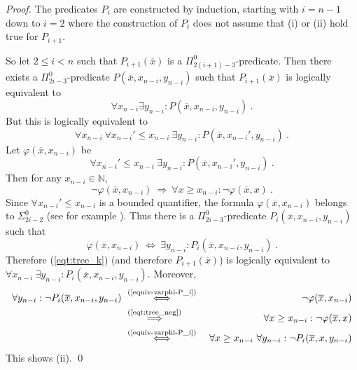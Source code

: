 \documentclass[envcountsame]{llncs}
\newcommand{\N}{\mathbb N}
\begin{document}
\begin{proof}
  The predicates $P_i$ are constructed by induction, starting with
  $i=n-1$ down to $i=2$ where the construction of $P_i$ does not
  assume that (i) or (ii) hold true for $P_{i+1}$.

  So let $2\le i<n$ such that $P_{i+1}(\overline x)$ is a
  $\Pi^0_{2(i+1)-3}$-predicate. Then there exists a
  $\Pi^0_{2i-3}$-predicate $P(\overline x,x_{n-i},y_{n-i})$ such that
  $P_{i+1}(\overline x)$ is logically equivalent to
  \[
     \forall x_{n-i}\exists y_{n-i}: P(\overline x,x_{n-i},y_{n-i})\ .
  \]
  But this is logically equivalent to
  \begin{equation}\label{eqt:tree_k}
     \forall x_{n-i}\ \forall x_{n-i}'\leq x_{n-i} \ \exists y_{n-i} :
         P(\overline{x},x_{n-i}',y_{n-i})\ .
  \end{equation}
  Let $\varphi(\overline{x},x_{n-i})$ be
  \[
     \forall x_{n-i}'\leq x_{n-i} \ \exists y_{n-i} :
         P(\overline{x},x_{n-i}',y_{n-i})\ .
  \]
  Then for any $x_{n-i}\in \N$,
  \begin{equation}\label{eqt:tree_neg}
    \neg \varphi(\overline{x},x_{n-i}) \ \Longrightarrow \
       \forall x \geq x_{n-i} : \neg \varphi(\overline{x},x)\ .
  \end{equation}
  Since $\forall x_{n-i}'\leq x_{n-i}$ is a bounded quantifier, the
  formula $\varphi(\overline{x},x_{n-i})$ belongs to $\Sigma^0_{2i-2}$
  (see for example \cite[p. 61]{Soa87}).  Thus there is a
  $\Pi^0_{2i-3}$-predicate $P_i(\overline{x},x_{n-i},y_{n-i})$ such that
  \begin{equation} \label{equiv-varphi-P_i}
    \varphi(\overline{x},x_{n-i})  \ \Longleftrightarrow \ \exists y_{n-i} : P_i(\overline{x},x_{n-i},y_{n-i})\ .
  \end{equation}
  Therefore (\ref{eqt:tree_k}) (and therefore $P_{i+1}(\overline{x})$)
  is logically equivalent to
  $\forall x_{n-i} \ \exists y_{n-i} : P_i(\overline{x},x_{n-i},y_{n-i})$.
  Moreover,
  \begin{eqnarray*}
  \forall y_{n-i} : \neg P_i(\overline{x},x_{n-i},y_{n-i}) 
  \ & \stackrel{\text{(\ref{equiv-varphi-P_i})}}{\Longleftrightarrow} & \
  \neg \varphi(\overline{x},x_{n-i}) \\
  &  \stackrel{\text{(\ref{eqt:tree_neg})}}{\Longrightarrow} & \
  \forall x \geq x_{n-i} : \neg \varphi(\overline{x},x) \\
  & \stackrel{\text{(\ref{equiv-varphi-P_i})}}{\Longleftrightarrow} & \
     \forall x \geq x_{n-i}\ \forall y_{n-i} : \neg
    P_i(\overline{x},x,y_{n-i})
 \end{eqnarray*} 
 This shows (ii).  \qed
\end{proof}
\end{document}
